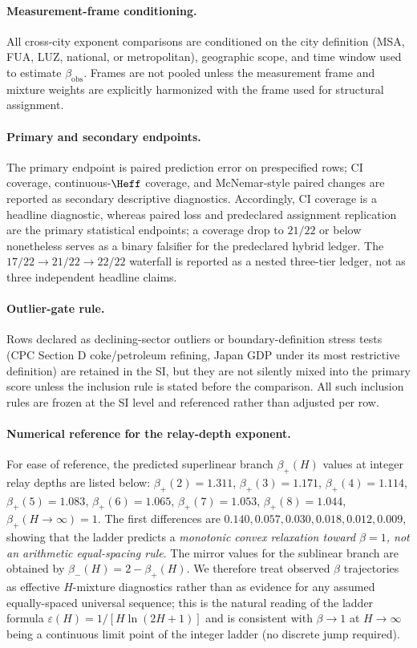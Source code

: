 \paragraph{Measurement-frame conditioning.}
All cross-city exponent comparisons are conditioned on the city definition
(MSA, FUA, LUZ, national, or metropolitan), geographic scope, and time window
used to estimate \(\beta_{\mathrm{obs}}\).  Frames are not pooled unless the
measurement frame and mixture weights are explicitly harmonized with the
frame used for structural assignment.

\paragraph{Primary and secondary endpoints.}
The primary endpoint is paired prediction error on prespecified rows; CI
coverage, continuous-\(\Heff\) coverage, and McNemar-style paired changes
are reported as secondary descriptive diagnostics. Accordingly, CI coverage is a headline diagnostic, whereas paired loss and predeclared assignment replication are the primary statistical endpoints; a coverage drop to $21/22$ or below nonetheless serves as a binary falsifier for the predeclared hybrid ledger.  The
\(17/22\to 21/22\to 22/22\) waterfall is reported as a nested three-tier
ledger, not as three independent headline claims.

\paragraph{Outlier-gate rule.}
Rows declared as declining-sector outliers or boundary-definition stress
tests (CPC Section D coke/petroleum refining, Japan GDP under its most
restrictive definition) are retained in the SI, but they are not silently
mixed into the primary score unless the inclusion rule is stated before the
comparison.  All such inclusion rules are frozen at the SI level and
referenced rather than adjusted per row.

\paragraph{Numerical reference for the relay-depth exponent.}
For ease of reference, the predicted superlinear branch $\beta_+(H)$ values at integer relay depths are listed below:
$\beta_+(2)=1.311$, $\beta_+(3)=1.171$, $\beta_+(4)=1.114$, $\beta_+(5)=1.083$, $\beta_+(6)=1.065$, $\beta_+(7)=1.053$, $\beta_+(8)=1.044$, $\beta_+(H{\to}\infty)=1$. The first differences are $0.140, 0.057, 0.030, 0.018, 0.012, 0.009$, showing that the ladder predicts a \emph{monotonic convex relaxation toward $\beta{=}1$, not an arithmetic equal-spacing rule}. The mirror values for the sublinear branch are obtained by $\beta_-(H)=2-\beta_+(H)$. We therefore treat observed $\beta$ trajectories as effective $H$-mixture diagnostics rather than as evidence for any assumed equally-spaced universal sequence; this is the natural reading of the ladder formula $\varepsilon(H)=1/[H\ln(2H{+}1)]$ and is consistent with $\beta\!\to\!1$ at $H\!\to\!\infty$ being a continuous limit point of the integer ladder (no discrete jump required).

